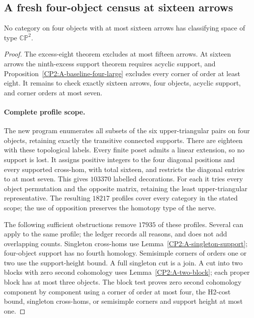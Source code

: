 \subsection{A fresh four-object census at sixteen arrows}

\begin{proposition}
\label{CP2:A-baseline-four-census}
No category on four objects with at most sixteen arrows has
classifying space of type $\mathbb{CP}^2$.
\end{proposition}
\begin{proof}
The excess-eight theorem excludes at most fifteen arrows.
At sixteen arrows the ninth-excess support theorem requires
acyclic support, and Proposition~\ref{CP2:A-baseline-four-large}
excludes every corner of order at least eight.  It remains
to check exactly sixteen arrows, four objects, acyclic
support, and corner orders at most seven.

\paragraph{Complete profile scope.}
The new program 
enumerates all subsets of the six upper-triangular pairs on
four objects, retaining exactly the transitive connected
supports.  There are eighteen with these topological labels.
Every finite poset admits a linear extension, so no support
is lost.  It assigns positive integers to the four diagonal
positions and every supported cross-hom, with total sixteen,
and restricts the diagonal entries to at most seven.  This
gives $103370$ labelled decorations.  For each it tries every
object permutation and the opposite matrix, retaining the
least upper-triangular representative.  The resulting
$18217$ profiles cover every category in the stated scope;
the use of opposition preserves the homotopy type of the
nerve.

The following sufficient obstructions remove $17935$ of
these profiles.  Several can apply to the same profile;
the ledger records all reasons, and does not add overlapping
counts.  Singleton cross-homs use
Lemma~\ref{CP2:A-singleton-support}; four-object support has
no fourth homology.  Semisimple corners of orders one or
two use the support-height bound.  A full singleton cut is
a join.  A cut into two blocks with zero second cohomology
uses Lemma~\ref{CP2:A-two-block}; each proper block has at
most three objects.  The block test proves zero second
cohomology component by component using a corner of order
at most four, the H2-cost bound, singleton cross-homs, or
semisimple corners and support height at most one.


\end{proof}
